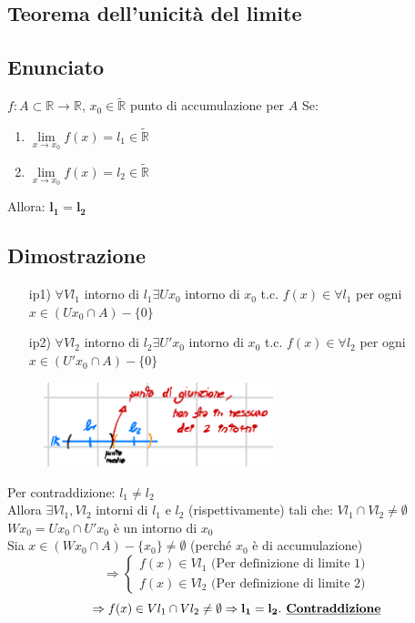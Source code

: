 \documentclass{article}
\newcommand{\R}{\mathbb{R}}
\newcommand{\Rext}{\widetilde{\mathbb{R}}}
\begin{document}
\begin{flushleft}
\section{Teorema dell'unicità del limite}
\subsection{Enunciato}
$f: A \subset \R \rightarrow \R$, $x_0 \in \Rext$ punto di accumulazione per $A$
Se:
\begin{enumerate}
    \item $\lim\limits_{x \to x_0} f(x) = l_1 \in \Rext$
    \item $\lim\limits_{x \to x_0} f(x) = l_2 \in \Rext$
\end{enumerate}
Allora: $\mathbf{l_1 = l_2}$

\subsection{Dimostrazione}

\begin{enumerate}
    \item[ip1)] $\forall V l_1 $ intorno di $l_1 \exists U x_0$ intorno di $x_0$ t.c. $f(x)\in\forall l_1 $ per ogni $x\in (U x_0 \cap A) - \{0\}$
    \item[ip2)] $\forall V l_2 $ intorno di $l_2 \exists U' x_0$ intorno di $x_0$ t.c. $f(x)\in\forall l_2 $ per ogni $x\in (U' x_0 \cap A) - \{0\}$
\end{enumerate}

\begin{figure}[h]
    \centering
    \includegraphics[width=18em]{./images/unicitaLimite.PNG}
\end{figure}

Per contraddizione: $l_1 \neq l_2$
\\Allora $\exists Vl_1, Vl_2$ intorni di $l_1$ e $l_2$ (rispettivamente) tali che: $Vl_1 \cap Vl_2 \neq \emptyset$
\\$Wx_0 = U x_0 \cap U'x_0$ è un intorno di $x_0$
\\Sia $x \in(Wx_0 \cap A) - \{x_0\} \neq \emptyset$ (perché $x_0$ è di accumulazione)
\[
    \Rightarrow
    \begin{cases}
        f(x) \in Vl_1 \text{  (Per definizione di limite 1)}\\
        f(x) \in Vl_2 \text{  (Per definizione di limite 2)}
    \end{cases}
\]
\[
    \Rightarrow f(x) \in Vl_1 \cap Vl_2 \neq \emptyset \Rightarrow \mathbf{l_1 = l_2}. \mathbf{\textbf{ \underline{Contraddizione}}}
\]
\newpage

\end{flushleft}
\end{document}
